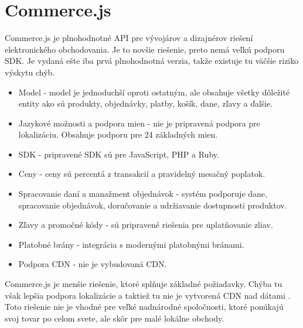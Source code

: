 \documentclass[
  printed, %
  table,   %
  lof,     %
  nolot,     %
  twoside,  
]{fithesis3}
\begin{document}
\section{Commerce.js}
Commerce.js je plnohodnotné API pre vývojárov a dizajnérov riešení elektronického obchodovania. Je to novšie riešenie, preto nemá veľkú podporu SDK. Je vydaná ešte iba prvá plnohodnotná verzia, takže existuje tu väčšie riziko výskytu chýb.
\begin{itemize}
	\item Model - model je jednoduchší oproti ostatným, ale obsahuje všetky dôležité entity ako sú produkty, objednávky, platby, košík, dane, zľavy a ďalšie. 
	\item Jazykové možnosti a podpora mien - nie je pripravená podpora pre lokalizáciu. Obsahuje podporu pre 24 základných mien.
	\item SDK - pripravené SDK sú pre JavaScript, PHP a Ruby.
	\item Ceny - ceny sú percentá z transakcií a pravidelný mesačný poplatok.
	\item Spracovanie daní a manažment objednávok - systém podporuje dane, spracovanie objednávok, doručovanie a udržiavanie dostupnosti produktov. 
	\item Zľavy a promočné kódy - sú pripravené riešenia pre uplatňovanie zliav.
	\item Platobné brány - integrácia s modernými platobnými bránami.
	\item Podpora CDN - nie je vybudovaná CDN.
\end{itemize}
Commerce.js je menšie riešenie, ktoré splňuje základné požiadavky. Chýba tu však lepšia podpora lokalizácie a taktiež tu nie je vytvorená CDN nad dátami \cite{Commerce.js}. Toto riešenie nie je vhodné pre veľké nadnárodné spoločnosti, ktoré ponúkajú svoj tovar po celom svete, ale skôr pre malé lokálne obchody.
\end{document}
